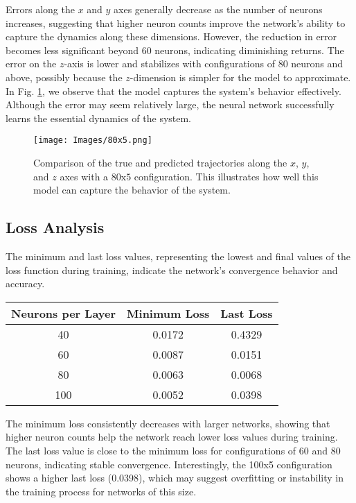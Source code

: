 \noindent
Errors along the \( x \) and \( y \) axes generally decrease as the number of neurons increases, suggesting that higher neuron counts improve the network’s ability to capture the dynamics along these dimensions. However, the reduction in error becomes less significant beyond 60 neurons, indicating diminishing returns. The error on the \( z \)-axis is lower and stabilizes with configurations of 80 neurons and above, possibly because the \( z \)-dimension is simpler for the model to approximate. In Fig. \ref{fig:trajectory_comparison}, we observe that the model captures the system's behavior effectively. Although the error may seem relatively large, the neural network successfully learns the essential dynamics of the system.

\begin{figure}[h!]
    \centering
    \texttt{[image: Images/80x5.png]}
    \caption{Comparison of the true and predicted trajectories along the \( x \), \( y \), and \( z \) axes with a $80\text{x}5$ configuration. This illustrates how well this model can capture the behavior of the system.}
    \label{fig:trajectory_comparison}
\end{figure}

\subsection{Loss Analysis}
The minimum and last loss values, representing the lowest and final values of the loss function during training, indicate the network’s convergence behavior and accuracy. 

\begin{center}
\begin{tabular}{|c|c|c|}
\hline
Neurons per Layer & Minimum Loss & Last Loss \\
\hline
40 & 0.0172 & 0.4329 \\
60 & 0.0087 & 0.0151 \\
80 & 0.0063 & 0.0068 \\
100 & 0.0052 & 0.0398 \\
\hline
\end{tabular}
\end{center}

\noindent
The minimum loss consistently decreases with larger networks, showing that higher neuron counts help the network reach lower loss values during training. The last loss value is close to the minimum loss for configurations of 60 and 80 neurons, indicating stable convergence. Interestingly, the 100x5 configuration shows a higher last loss (0.0398), which may suggest overfitting or instability in the training process for networks of this size.

